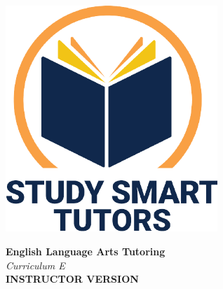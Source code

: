 \documentclass[12pt]{article}
\title{}
\date{}
\newcommand{\levelLetter}{E}  %
\begin{document}


\thispagestyle{empty}

\vspace*{\fill}

\vspace*{3cm}

\begin{center}

    \includegraphics[width=0.6\textwidth]{SST_Color_Logo.png} %
    
    \vspace{2cm} %
    

    
    \Huge \textbf{English Language Arts  Tutoring}\\
    [0.3cm]
     \vspace{1cm}
    \LARGE \textit{Curriculum \levelLetter}\\[1cm] 
   

    \Huge \textbf{INSTRUCTOR VERSION}
    
   
    
    \vfill %
    
\end{center}
\newpage
\thispagestyle{empty}
\vspace*{\fill}
\newpage





\end{document}
